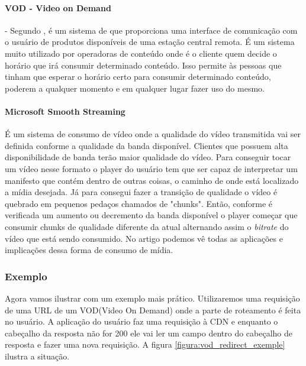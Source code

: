 \paragraph{VOD - Video on Demand} - Segundo \cite{garfinkle1996video}, \'e um sistema de que proporciona uma interface de comunica\c{c}\~ao com o usu\'ario de produtos dispon\'iveis de uma esta\c{c}\~ao central remota.
\newline \'E um sistema muito utilizado por operadoras de conte\'udo onde \'e o cliente quem decide o hor\'ario que ir\'a consumir determinado conte\'udo.
\newline Isso permite \`as pessoas que tinham que esperar o hor\'ario certo para consumir determinado conte\'udo, poderem a qualquer momento e em qualquer lugar fazer uso do mesmo.
\paragraph{Microsoft Smooth Streaming} \'E um sistema de consumo de v\'ideo onde a qualidade do v\'ideo transmitida vai ser definida conforme a qualidade da banda dispon\'ivel. Clientes que possuem alta disponibilidade de banda ter\~ao maior qualidade do v\'ideo. 
\newline Para conseguir tocar um v\'ideo nesse formato o player do usu\'ario tem que ser capaz de interpretar um manifesto que cont\'em dentro de outras coisas, o caminho de onde est\'a localizado a m\'idia desejada. 
\newline J\'a para consegui fazer a transi\c{c}\~ao de qualidade o v\'ideo \'e quebrado em pequenos peda\c{c}os chamados de "chunks". Ent\~ao, conforme \'e verificada um aumento ou decremento da banda dispon\'ivel o player come\c{c}ar que consumir chunks de qualidade diferente da atual alternando assim o \textit{bitrate} do v\'ideo que est\'a sendo consumido. 
\newline No artigo \cite{zambelli2009iis} podemos v\^e todas as aplica\c{c}\~oes e implica\c{c}\~oes dessa forma de consumo de m\'idia.
\subsubsection{Exemplo}
\label{subsubsection:vod_exemplo}
Agora vamos ilustrar com um exemplo mais pr\'atico. Utilizaremos uma requisi\c{c}\~ao de uma URL de um VOD(Video On Demand) onde a parte de roteamento \'e feita no usu\'ario. A aplica\c{c}\~ao do usu\'ario faz uma requisi\c{c}\~ao \`a CDN e enquanto o cabe\c{c}alho da resposta n\~ao for 200 ele vai ler um campo dentro do cabe\c{c}alho de resposta e fazer uma nova requisi\c{c}\~ao. A figura  \ref{figura:vod_redirect_exemple} ilustra a situa\c{c}\~ao.

